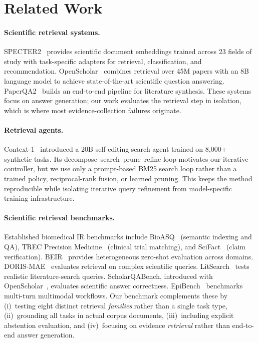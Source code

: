 \documentclass{article}
\begin{document}
\section{Related Work}
\label{sec:related}

\paragraph{Scientific retrieval systems.}
SPECTER2~\cite{specter2} provides scientific document embeddings trained across 23 fields of study with task-specific adapters for retrieval, classification, and recommendation. OpenScholar~\cite{openscholar2026} combines retrieval over 45M papers with an 8B language model to achieve state-of-the-art scientific question answering. PaperQA2~\cite{skarlinski2024paperqa2} builds an end-to-end pipeline for literature synthesis. These systems focus on answer generation; our work evaluates the retrieval step in isolation, which is where most evidence-collection failures originate.

\paragraph{Retrieval agents.}
Context-1~\cite{context2026} introduced a 20B self-editing search agent trained on 8,000+ synthetic tasks. Its decompose--search--prune--refine loop motivates our iterative controller, but we use only a prompt-based BM25 search loop rather than a trained policy, reciprocal-rank fusion, or learned pruning. This keeps the method reproducible while isolating iterative query refinement from model-specific training infrastructure.

\paragraph{Scientific retrieval benchmarks.}
Established biomedical IR benchmarks include BioASQ~\cite{bioasq2015} (semantic indexing and QA), TREC Precision Medicine~\cite{trecpm2017} (clinical trial matching), and SciFact~\cite{scifact2020} (claim verification). BEIR~\cite{beir2021} provides heterogeneous zero-shot evaluation across domains. DORIS-MAE~\cite{dorismae2023} evaluates retrieval on complex scientific queries. LitSearch~\cite{litsearch2024} tests realistic literature-search queries. ScholarQABench, introduced with OpenScholar~\cite{openscholar2026}, evaluates scientific answer correctness. EpiBench~\cite{epibench2026} benchmarks multi-turn multimodal workflows. Our benchmark complements these by (i)~testing eight distinct retrieval \emph{families} rather than a single task type, (ii)~grounding all tasks in actual corpus documents, (iii)~including explicit abstention evaluation, and (iv)~focusing on evidence \emph{retrieval} rather than end-to-end answer generation.
\end{document}
